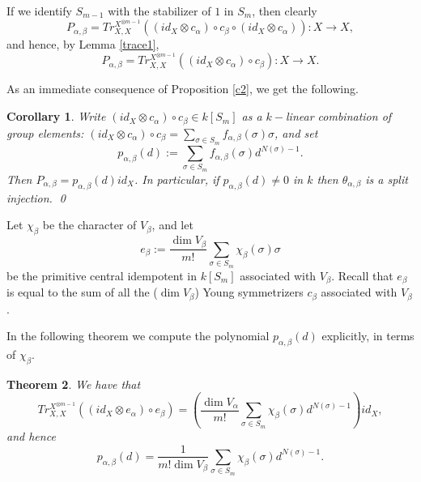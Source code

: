 \documentclass{amsart}
\newtheorem{theorem}{Theorem}[section]
\newtheorem{corollary}[theorem]{Corollary}
\theoremstyle{definition}
\newcommand{\ot}{\otimes}
\newcommand{\unit}{{\bf 1}}
\begin{document}
If we identify $S_{m-1}$ with the stabilizer of $1$ in $S_{m}$, then
clearly
$$P_{\alpha,\beta}=Tr_{X,X}^{X^{\ot m-1 }}((id_X\ot c_{\alpha})
\circ c_{\beta}\circ (id_X\ot c_{\alpha})):X\to X,$$ and hence, by
Lemma \ref{trace1},
$$P_{\alpha,\beta}=Tr_{X,X}^{X^{\ot m-1}}((id_X\ot c_{\alpha})\circ
c_{\beta}):X\to X.$$

As an immediate consequence of Proposition \ref{c2}, we get the
following.
\begin{corollary}
Write $(id_X\ot c_{\alpha})\circ c_{\beta}\in k[S_{m}]$ as a
$k-$linear combination of group elements: $(id_X\ot c_{\alpha})\circ
c_{\beta}=\sum_{\sigma\in S_{m}}f_{\alpha,\beta}(\sigma)\sigma$, and
set $$p_{\alpha,\beta}(d):=\sum_{\sigma\in
S_{m}}f_{\alpha,\beta}(\sigma)d^{N(\sigma)-1}.$$ Then
$P_{\alpha,\beta}=p_{\alpha,\beta}(d)id_X$. In particular, if
$p_{\alpha,\beta}(d)\ne 0$ in $k$ then $\theta_{\alpha,\beta}$ is a
split injection. \qed
\end{corollary}

Let $\chi_{\beta}$ be the character of $V_{\beta}$, and let
$$e_{\beta}:=\frac{\dim V_{\beta}}{m!}\sum_{\sigma\in
S_m}\chi_{\beta}(\sigma) \sigma$$ be the primitive central
idempotent in $k[S_m]$ associated with $V_{\beta}$. Recall that
$e_{\beta}$ is equal to the sum of all the ($\dim V_{\beta}$) Young
symmetrizers $c_{\beta}$ associated with $V_{\beta}$.

In the following theorem we compute the polynomial
$p_{\alpha,\beta}(d)$ explicitly, in terms of $\chi_{\beta}$.

\begin{theorem}\label{c1}
We have that
$$Tr_{X,X}^{X^{\ot m-1 }}\left((id_X\ot
e_{\alpha})\circ e_{\beta}\right)=\left(\frac{\dim
V_{\alpha}}{m!}\sum_{\sigma\in S_{m}}\chi_{\beta}(\sigma)
d^{N(\sigma)-1}\right)id_X,$$ and hence
$$p_{\alpha,\beta}(d)=\frac{1}{m!\dim
V_{\beta}}\sum_{\sigma\in S_{m}}\chi_{\beta}(\sigma)
d^{N(\sigma)-1}.$$
\end{theorem}
\end{document}
